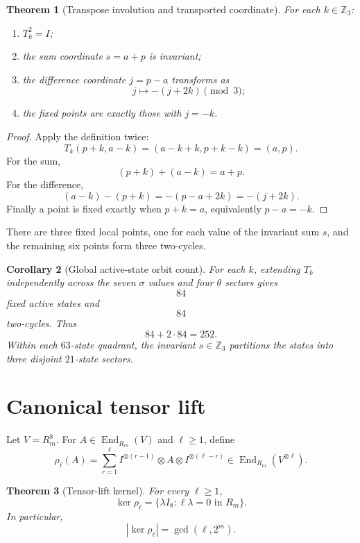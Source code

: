 \documentclass[11pt]{article}
\newtheorem{theorem}{Theorem}
\newtheorem{corollary}[theorem]{Corollary}
\theoremstyle{definition}
\newcommand{\Z}{\mathbb Z}
\begin{document}
\begin{theorem}[Transpose involution and transported coordinate]\label{thm:transpose}
For each $k\in\Z_3$:
\begin{enumerate}[leftmargin=*]
\item $T_k^2=I$;
\item the sum coordinate $s=a+p$ is invariant;
\item the difference coordinate $j=p-a$ transforms as
\[
j\mapsto-(j+2k)\pmod3;
\]
\item the fixed points are exactly those with $j=-k$.
\end{enumerate}
\end{theorem}

\begin{proof}
Apply the definition twice:
\[
T_k(p+k,a-k)=(a-k+k,p+k-k)=(a,p).
\]
For the sum,
\[
(p+k)+(a-k)=a+p.
\]
For the difference,
\[
(a-k)-(p+k)=-(p-a+2k)=-(j+2k).
\]
Finally a point is fixed exactly when $p+k=a$, equivalently $p-a=-k$.
\end{proof}

There are three fixed local points, one for each value of the invariant sum $s$, and the remaining six points form three two-cycles.

\begin{corollary}[Global active-state orbit count]\label{cor:orbits}
For each $k$, extending $T_k$ independently across the seven $\sigma$ values and four $\theta$ sectors gives
\[
84
\]
fixed active states and
\[
84
\]
two-cycles. Thus
\[
84+2\cdot84=252.
\]
Within each $63$-state quadrant, the invariant $s\in\Z_3$ partitions the states into three disjoint $21$-state sectors.
\end{corollary}

\section{Canonical tensor lift}
Let $V=R_m^8$. For $A\in\operatorname{End}_{R_m}(V)$ and $\ell\ge1$, define
\[
\rho_\ell(A)
=
\sum_{r=1}^{\ell}
I^{\otimes(r-1)}
\otimes A
\otimes I^{\otimes(\ell-r)}
\in
\operatorname{End}_{R_m}(V^{\otimes\ell}).
\]

\begin{theorem}[Tensor-lift kernel]\label{thm:kernel}
For every $\ell\ge1$,
\[
\boxed{
\ker\rho_\ell
=
\{\lambda I_8:\ell\lambda=0\text{ in }R_m\}.}
\]
In particular,
\[
|\ker\rho_\ell|=\gcd(\ell,2^m).
\]
\end{theorem}
\end{document}
